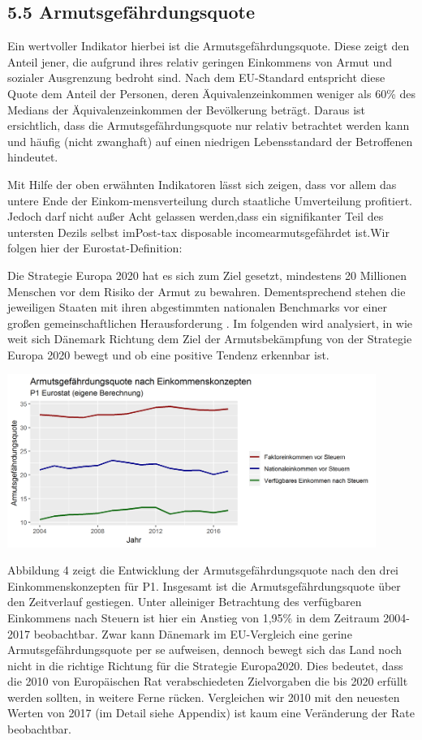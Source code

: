\documentclass[12pt,]{article}
\let\origfigure\figure
\let\endorigfigure\endfigure
\renewenvironment{figure}[1][2] {
        \expandafter\origfigure\expandafter[H]
      } {\endorigfigure}
\begin{document}
\subsection{5.5 Armutsgefährdungsquote}\label{armutsgefahrdungsquote}

Ein wertvoller Indikator hierbei ist die Armutsgefährdungsquote. Diese
zeigt den Anteil jener, die aufgrund ihres relativ geringen Einkommens
von Armut und sozialer Ausgrenzung bedroht sind. Nach dem EU-Standard
entspricht diese Quote dem Anteil der Personen, deren
Äquivalenzeinkommen weniger als 60\% des Medians der Äquivalenzeinkommen
der Bevölkerung beträgt. Daraus ist ersichtlich, dass die
Armutsgefährdungsquote nur relativ betrachtet werden kann und häufig
(nicht zwanghaft) auf einen niedrigen Lebensstandard der Betroffenen
hindeutet.

Mit Hilfe der oben erwähnten Indikatoren lässt sich zeigen, dass vor
allem das untere Ende der Einkom-mensverteilung durch staatliche
Umverteilung profitiert. Jedoch darf nicht außer Acht gelassen
werden,dass ein signifikanter Teil des untersten Dezils selbst
imPost-tax disposable incomearmutsgefährdet ist.Wir folgen hier der
Eurostat-Definition:

Die Strategie Europa 2020 hat es sich zum Ziel gesetzt, mindestens 20
Millionen Menschen vor dem Risiko der Armut zu bewahren. Dementsprechend
stehen die jeweiligen Staaten mit ihren abgestimmten nationalen
Benchmarks vor einer großen gemeinschaftlichen Herausforderung . Im
folgenden wird analysiert, in wie weit sich Dänemark Richtung dem Ziel
der Armutsbekämpfung von der Strategie Europa 2020 bewegt und ob eine
positive Tendenz erkennbar ist.

\begin{figure}
\centering
\includegraphics[width=0.90000\textwidth]{img/arpr.png}
\caption{Armutsgefährdungsquote, 2004-2017}
\end{figure}

Abbildung 4 zeigt die Entwicklung der Armutsgefährdungsquote nach den
drei Einkommenskonzepten für P1. Insgesamt ist die
Armutsgefährdungsquote über den Zeitverlauf gestiegen. Unter alleiniger
Betrachtung des verfügbaren Einkommens nach Steuern ist hier ein Anstieg
von 1,95\% in dem Zeitraum 2004-2017 beobachtbar. Zwar kann Dänemark im
EU-Vergleich eine gerine Armutsgefährdungsquote per se aufweisen,
dennoch bewegt sich das Land noch nicht in die richtige Richtung für die
Strategie Europa2020. Dies bedeutet, dass die 2010 von Europäischen Rat
verabschiedeten Zielvorgaben die bis 2020 erfüllt werden sollten, in
weitere Ferne rücken. Vergleichen wir 2010 mit den neuesten Werten von
2017 (im Detail siehe Appendix) ist kaum eine Veränderung der Rate
beobachtbar.
\end{document}
